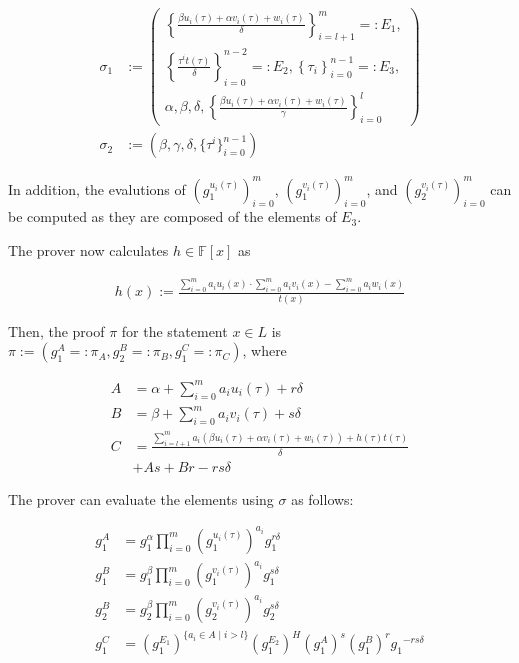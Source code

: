 \documentclass{article}
\begin{document}
\begin{adjustbox}{max width=.5\textwidth}
\parbox{\linewidth}{
\begin{align*}
        \sigma_1 &:= \left(\begin{aligned}\left\{\frac{\beta u_i(\tau) + \alpha v_i(\tau) + w_i(\tau)}{\delta}\right\}_{i=l+1}^m =: E_1,\\
        \left\{\frac{\tau^i t(\tau)}{\delta}\right\}_{i=0}^{n-2} =: E_2, \left\{\tau_i\right\}_{i=0}^{n-1} =: E_3,\\
        \alpha, \beta, \delta, \left\{\frac{\beta u_i(\tau) + \alpha v_i(\tau) + w_i(\tau)}{\gamma}\right\}_{i=0}^l\end{aligned}\right) \\
        \sigma_2 &:= \left(\beta, \gamma, \delta, \{\tau^i\}_{i=0}^{n-1}\right)
\end{align*}}
\end{adjustbox}

In addition, the evalutions of $(g_1^{u_i(\tau)})_{i=0}^m$, $(g_1^{v_i(\tau)})_{i=0}^m$, and $(g_2^{v_i(\tau)})_{i=0}^m$ can be computed as they are composed of the elements of $E_3$.

The prover now calculates $h \in \mathbb{F}[x]$ as

\begin{align}h(x) := \frac{\sum_{i=0}^m a_iu_i(x) \cdot \sum_{i=0}^m a_iv_i(x) - \sum_{i=0}^{m} a_iw_i(x)}{t(x)} \label{eq:h}\end{align}

Then, the proof $\pi$ for the statement $x \in L$ is $\pi := (g_1^A =: \pi_A, g_2^B =: \pi_B, g_1^C =: \pi_C)$, where

\begin{align}
        A &= \alpha + \sum_{i=0}^m a_iu_i(\tau) + r\delta \label{eq:A} \\
        B &= \beta + \sum_{i=0}^m a_iv_i(\tau) + s\delta \label{eq:B} \\
        C &= \frac{\sum_{i=l+1}^m a_i(\beta u_i(\tau) + \alpha v_i(\tau) + w_i(\tau)) + h(\tau)t(\tau)}{\delta} \label{eq:C} \\
        & + As + Br - rs\delta \nonumber
\end{align}

The prover can evaluate the elements using $\sigma$ as follows:

\begin{align}
        g_1^A &= g_1^\alpha \prod_{i=0}^m {(g_1^{u_i(\tau)})}^{a_i} g_1^{r\delta} \label{eq:gA} \\
        g_1^B &= g_1^\beta \prod_{i=0}^m {(g_1^{v_i(\tau)})}^{a_i} g_1^{s\delta} \label{eq:g1B} \\
        g_2^B &= g_2^\beta \prod_{i=0}^m {(g_2^{v_i(\tau)})}^{a_i} g_2^{s\delta} \label{eq:g2B} \\
        g_1^C &= {(g_1^{E_1})}^{\{a_i \in A \mid i > l\}} {(g_1^{E_2})}^H {(g_1^A)}^s {(g_1^B)}^r {g_1}^{-rs\delta} \label{eq:gC} 
\end{align}
\end{document}
